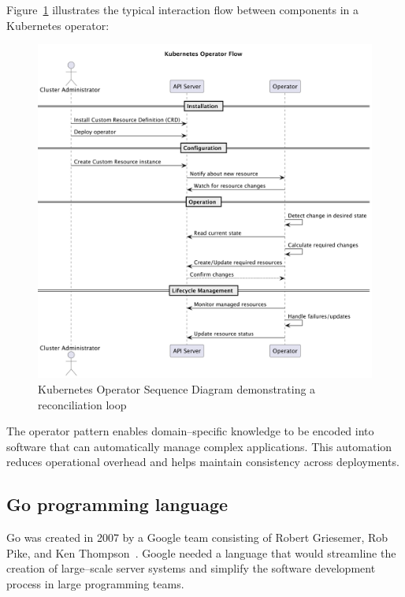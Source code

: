 Figure~\ref{fig:kubernetes-operator-flow} illustrates the typical interaction flow between components in a Kubernetes operator:

\begin{figure}[htbp]
    \centering
    \includegraphics[width=\textwidth]{images/kubernetes_operator_flow}
    \caption{Kubernetes Operator Sequence Diagram demonstrating a reconciliation loop}
    \label{fig:kubernetes-operator-flow}
\end{figure}

The operator pattern enables domain--specific knowledge to be encoded into software that can automatically manage complex applications.
This automation reduces operational overhead and helps maintain consistency across deployments.

\subsection{Go programming language}\label{subsec:go-programming-language}

Go was created in 2007 by a Google team consisting of Robert Griesemer, Rob Pike, and Ken Thompson~\cite{golang}.
Google needed a language that would streamline the creation of large--scale server systems and simplify the software development process in large programming teams.

